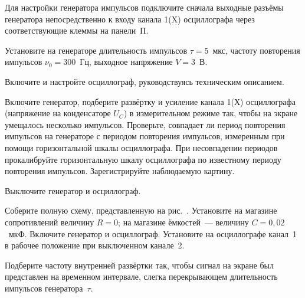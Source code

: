\begin{lab:task}




\item Для настройки генератора импульсов подключите 
сначала выходные разъёмы генератора непосредственно к входу канала 1(X) 
осциллографа через соответствующие клеммы на панели~П.

\item Установите на генераторе длительность импульсов $\tau=5$~мкс, 
частоту повторения импульсов $\nu_0=300$~Гц, выходное напряжение $V = 3$~В.

\item Включите и настройте осциллограф, руководствуясь техническим описанием.

\item Включите генератор, подберите развёртку и усиление канала 1(Х) осциллографа
(напряжение на конденсаторе $U_C$)
в измерительном режиме так, чтобы на экране умещалось несколько импульсов. 
Проверьте, совпадает ли период повторения импульсов на генераторе 
с периодом повторения импульсов, измеренным при помощи горизонтальной 
шкалы осциллографа. При несовпадении периодов прокалибруйте 
горизонтальную шкалу осциллографа по известному периоду повторения импульсов. 
Зарегистрируйте наблюдаемую картину. 

\item Выключите генератор и осциллограф.


\item Соберите полную схему, представленную на рис.~. 
Установите на магазине сопротивлений величину $R = 0$; на магазине ёмкостей~--- 
величину $C = 0,02$~мкФ. Включите генератор и осциллограф. Установите на 
осциллографе канал~1 в рабочее положение при выключенном канале~2. 

\item Подберите частоту внутренней развёртки так, чтобы сигнал на экране 
был представлен на временном интервале, слегка перекрывающем длительность 
импульсов генератора~$\tau$.


\end{lab:task}
